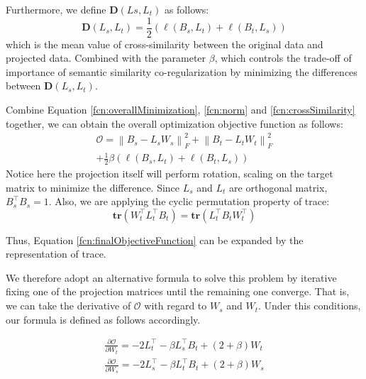 Furthermore, we define $\mathbf{D}\left(L{s}, L_{t}\right)$ as follows:
\begin{equation}
\label{fcn:crossSimilarity}
    \mathbf{D}\left(L_{s}, L_{t}\right) =\frac{1}{2}\left(\ell\left(B_s, L_{t}\right) + \ell\left(B_t, L_{s}\right)\right)
\end{equation}
which is the mean value of cross-similarity between the original data and projected data. Combined with the parameter $\beta$, which controls the trade-off of importance of semantic similarity co-regularization by minimizing the differences between $\mathbf{D}(L_{s}, L_{t})$.

Combine Equation \ref{fcn:overallMinimization}, \ref{fcn:norm} and \ref{fcn:crossSimilarity} together, we can obtain the overall optimization objective function as follows:
\begin{equation}
\label{fcn:finalObjectiveFunction}
\begin{split}
    \mathcal{O} = \left \| B_s - L_{s}W_{s}  \right \|_{F}^2 + \left \| B_t - L_{t}W_{t}\right \|_{F}^2 \\
    + \frac{1}{2}\beta \left(\ell\left(B_s, L_{t}\right) + \ell\left(B_t, L_{s}\right)\right)
\end{split}
\end{equation}
Notice here the projection itself will perform rotation, scaling on the target matrix to minimize the difference.
Since $L_s$ and $L_t$ are orthogonal matrix, $B_{s}^{\intercal}B_{s}=1$. Also, we are applying the cyclic permutation property of trace:
\begin{equation}
    \textbf{tr}\left(W_{t}^{\intercal}L_{t}^{\intercal}B_{t}\right) = \textbf{tr}\left(L_{t}^{\intercal}B_{t}W_{t}^{\intercal}\right)
\end{equation}

Thus, Equation \ref{fcn:finalObjectiveFunction} can be expanded by the representation of trace.

We therefore adopt an alternative formula to solve this problem by iterative fixing one of the projection matrices until the remaining one converge. 
That is, we can take the derivative of $\mathcal{O}$ with regard to $W_s$ and $W_t$.
Under this conditions, our formula is defined as follows accordingly.

\begin{equation}
\begin{split}
    \frac{\partial \mathcal{O}}{\partial W_{t}} = -2L_{t}^{\intercal} - \beta L_{s}^{\intercal}B_{t} + (2+\beta)W_{t} \\
    \frac{\partial \mathcal{O}}{\partial W_{s}} = -2L_{s}^{\intercal} - \beta L_{t}^{\intercal}B_{t} + (2+\beta)W_{s}
\end{split}
\end{equation}


